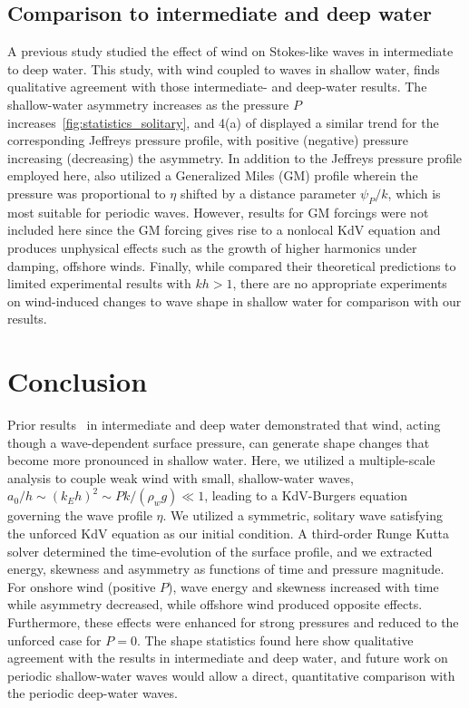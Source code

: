 \documentclass{jfm}
\begin{document}
\subsection{Comparison to intermediate and deep water}
A previous study \citep{zdyrski2020wind} studied the effect of
wind on Stokes-like waves in intermediate to deep water.
This study, with wind coupled to waves in shallow water, finds
qualitative agreement with those intermediate- and deep-water results.
The shallow-water asymmetry increases as the pressure $P$
increases~\cref{fig:statistics_solitary}, and \figname{} 4(a) of
\citet{zdyrski2020wind} displayed a similar trend for the corresponding
Jeffreys pressure profile, with positive (negative) pressure increasing
(decreasing) the asymmetry.
In addition to the Jeffreys pressure profile employed here,
\citet{zdyrski2020wind} also utilized a Generalized Miles (GM) profile
wherein the pressure was proportional to $\eta$ shifted by a distance
parameter $\psi_P/k$, which is most suitable for periodic waves.
However, results for GM forcings were not included here since the GM
forcing gives rise to a nonlocal KdV equation and produces unphysical
effects such as the growth of higher harmonics under damping, offshore
winds.
Finally, while \citet{zdyrski2020wind} compared their theoretical
predictions to limited experimental results with $kh > 1$, there are no
appropriate experiments on wind-induced changes to wave shape in shallow
water for comparison with our results.

\section{Conclusion}
Prior results~\citep{zdyrski2020wind} in intermediate and deep water
demonstrated that wind, acting though a wave-dependent surface
pressure, can generate shape changes that become more pronounced in
shallow water.
Here, we utilized a multiple-scale analysis to couple weak wind with
small, shallow-water waves, \ie{} $a_0/h \sim (k_E h)^2 \sim P k/(\rho_w
g) \ll 1$, leading to a KdV-Burgers equation governing the wave profile
$\eta$.
We utilized a symmetric, solitary wave satisfying the unforced KdV
equation as our initial condition.
A third-order Runge Kutta solver determined the time-evolution of the
surface profile, and we extracted energy, skewness and asymmetry as
functions of time and pressure magnitude.
For onshore wind (positive $P$), wave energy and skewness increased with
time while asymmetry decreased, while offshore wind produced opposite
effects.
Furthermore, these effects were enhanced for strong pressures and
reduced to the unforced case for $P=0$.
The shape statistics found here show qualitative agreement with the
results in intermediate and deep water, and future work on periodic
shallow-water waves would allow a direct, quantitative comparison with
the periodic deep-water waves.
\end{document}
